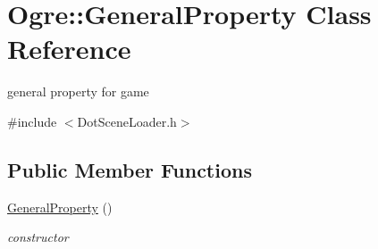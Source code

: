\hypertarget{class_ogre_1_1_general_property}{}\section{Ogre\+:\+:General\+Property Class Reference}
\label{class_ogre_1_1_general_property}


general property for game  




{\ttfamily \#include $<$Dot\+Scene\+Loader.\+h$>$}

\subsection*{Public Member Functions}
\begin{DoxyCompactItemize}
\item 
\hyperlink{class_ogre_1_1_general_property_acd71b59ffe1f1ce802513435f482175c}{General\+Property} ()\hypertarget{class_ogre_1_1_general_property_acd71b59ffe1f1ce802513435f482175c}{}\label{class_ogre_1_1_general_property_acd71b59ffe1f1ce802513435f482175c}

\begin{DoxyCompactList}\small\item\em constructor \end{DoxyCompactList}\end{DoxyCompactItemize}
